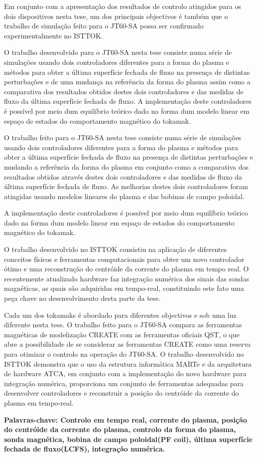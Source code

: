 Em conjunto com a apresentação dos resultados de controlo atingidos para os dois dispositivos nesta tese, um dos principais objectivos é também que o trabalho de simulação feito para o JT60-SA possa ser confirmado experimentalmente no ISTTOK.\smallskip

O trabalho desenvolvido para o JT60-SA nesta tese consiste numa série de simulações usando dois controladores diferentes para a forma do plasma e métodos para obter a última superfície fechada de fluxo na presença de distintas perturbações e de uma mudança na referência da forma do plasma assim como a comparativa dos resultados obtidos destes dois controladores e  das medidas de fluxo da última superfície fechada de fluxo. A implementação deste controladores é  possível por meio dum equilíbrio teórico dado na forma dum modelo linear em espaço de estados do comportamento magnético do tokamak.\smallskip

O trabalho feito para o JT60-SA nesta tese consiste numa série de simulações usando dois controladores diferentes para a forma do plasma e métodos para obter a última superfície fechada de fluxo na presença de distintas perturbações e mudando a referência da forma do plasma  em conjunto como a comparativa dos resultados obtidos através destes dois controladores e  das medidas de fluxo da última superfície fechada de fluxo.  As melhorias destes dois controladores foram atingidas usando modelos lineares  do plasma e das bobinas de campo poloidal.\smallskip

A implementação deste controladores é  possível por meio dum equilíbrio teórico dado na forma dum modelo linear em espaço de estados do comportamento magnético do tokamak. \smallskip


O trabalho desenvolvido no ISTTOK consistiu na aplicação de diferentes conceitos físicos e ferramentas computacionais para obter um novo controlador ótimo e uma reconstrução do centróide da corrente do plasma em tempo real. O recentemente atualizado hardware faz integração numérica dos sinais das sondas magnéticas, as quais são adquiridas em tempo-real, constituindo este fato uma peça chave no desenvolvimento desta parte da tese. \smallskip


Cada um dos tokamaks é abordado para diferentes objectivos e sob uma luz diferente nesta tese. O trabalho feito para o JT60-SA compara as ferramentas magnéticas de modelização CREATE com as ferramentas oficiais QST, o que abre a possibilidade de se considerar as ferramentas CREATE como uma reserva para otimizar o controlo na operação do JT60-SA. O trabalho desenvolvido no ISTTOK demonstra que o uso da estrutura informática MARTe e da arquitetura de hardware ATCA, em conjunto com a implementação do novo hardware para integração numérica, proporciona um conjunto de ferramentas adequadas para desenvolver controladores e reconstruir a posição do centróide da corrente do plasma em tempo-real. \smallskip


\vfill
\textbf{ Palavras-chave: Controlo em tempo real, corrente do plasma, posição do centróide da corrente do plasma,   controlo da forma do plasma, sonda magnética, bobina de campo poloidal(PF coil), última superfície fechada de fluxo(LCFS), integração numérica.    } 

